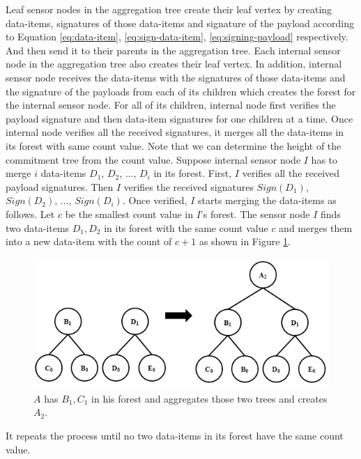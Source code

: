 	Leaf sensor nodes in the aggregation tree create their leaf vertex by creating data-items, signatures of those data-items and signature of the payload according to Equation \ref{eq:data-item}, \ref{eq:sign-data-item}, \ref{eq:signing-payload} respectively.
	And then send it to their parents in the aggregation tree.	
	Each internal sensor node in the aggregation tree also creates their leaf vertex.
	In addition, internal sensor node receives the data-items with the signatures of those data-items and the signature of the payloads from each of its children which creates the forest for the internal sensor node.
	For all of its children, internal node first verifies the payload signature and then data-item signatures for one children at a time.
	Once internal node verifies all the received signatures, it merges all the data-items in its forest with same count value.
	Note that we can determine the height of the commitment tree from the count value.
	Suppose internal sensor node $I$ has to merge $i$ data-items $D_{1}$, $D_{2}$, $\dotsc$, $D_{i}$ in its forest.
	First, $I$ verifies all the received payload signatures.
	Then $I$ verifies the received signatures $Sign(D_{1})$, $Sign(D_{2})$, $\dotsc$, $Sign(D_{i})$.
	Once verified, $I$ starts merging the data-items as follows.
	Let $c$ be the smallest count value in $I$'s forest.
	The sensor node $I$ finds two data-items $D_{1},D_{2}$ in its forest with the same count value $c$ and merges them into a new data-item with the count of $c+1$ as shown in Figure \ref{fig:increase-height}.
	\begin{figure}[h!]
		\includegraphics[width=6in]{images/increase-height.png}
		\caption{$A$ has $B_{1}, C_{1}$ in his forest and aggregates those two trees and creates $A_{2}$.}
		\label{fig:increase-height}
	\end{figure}
	It repeats the process until no two data-items in its forest have the same count value.	
	
